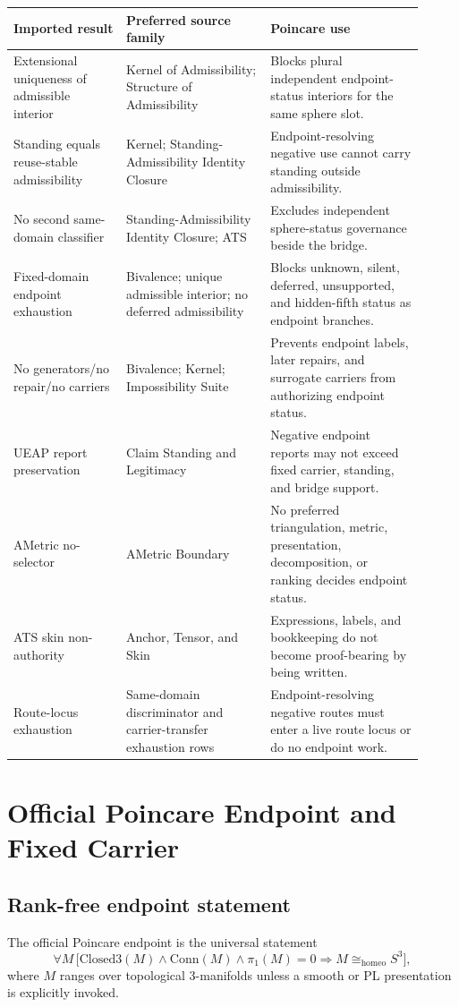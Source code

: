 \documentclass[11pt]{article}
\newcommand{\Sthree}{S^{3}}
\newcommand{\ClosedThree}{\mathrm{Closed3}}
\newcommand{\Conn}{\mathrm{Conn}}
\newcommand{\Homeo}{\cong_{\mathrm{homeo}}}
\begin{document}
\begin{longtable}{L{0.25\linewidth}L{0.32\linewidth}L{0.34\linewidth}}
\toprule
\textbf{Imported result} & \textbf{Preferred source family} & \textbf{Poincare use}\\
\midrule
Extensional uniqueness of admissible interior & Kernel of Admissibility; Structure of Admissibility & Blocks plural independent endpoint-status interiors for the same sphere slot.\\
Standing equals reuse-stable admissibility & Kernel; Standing-Admissibility Identity Closure & Endpoint-resolving negative use cannot carry standing outside admissibility.\\
No second same-domain classifier & Standing-Admissibility Identity Closure; ATS & Excludes independent sphere-status governance beside the bridge.\\
Fixed-domain endpoint exhaustion & Bivalence; unique admissible interior; no deferred admissibility & Blocks unknown, silent, deferred, unsupported, and hidden-fifth status as endpoint branches.\\
No generators/no repair/no carriers & Bivalence; Kernel; Impossibility Suite & Prevents endpoint labels, later repairs, and surrogate carriers from authorizing endpoint status.\\
UEAP report preservation & Claim Standing and Legitimacy & Negative endpoint reports may not exceed fixed carrier, standing, and bridge support.\\
AMetric no-selector & AMetric Boundary & No preferred triangulation, metric, presentation, decomposition, or ranking decides endpoint status.\\
ATS skin non-authority & Anchor, Tensor, and Skin & Expressions, labels, and bookkeeping do not become proof-bearing by being written.\\
Route-locus exhaustion & Same-domain discriminator and carrier-transfer exhaustion rows & Endpoint-resolving negative routes must enter a live route locus or do no endpoint work.\\
\bottomrule
\end{longtable}

\section{Official Poincare Endpoint and Fixed Carrier}\label{sec:official-endpoint}

\subsection{Rank-free endpoint statement}
The official Poincare endpoint is the universal statement
\[
\forall M\,\bigl[\ClosedThree(M)\wedge\Conn(M)\wedge\pi_1(M)=0\Rightarrow M\Homeo\Sthree\bigr],
\]
where \(M\) ranges over topological 3-manifolds unless a smooth or PL presentation is explicitly invoked.
\end{document}
